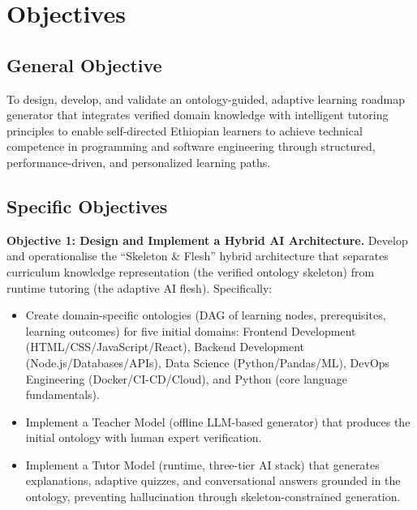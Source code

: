 \section{Objectives}
\label{sec:objectives}

\subsection{General Objective}

To design, develop, and validate an ontology-guided, adaptive learning roadmap generator that integrates verified domain knowledge with intelligent tutoring principles to enable self-directed Ethiopian learners to achieve technical competence in programming and software engineering through structured, performance-driven, and personalized learning paths.

\subsection{Specific Objectives}

\textbf{Objective 1: Design and Implement a Hybrid AI Architecture.} Develop and operationalise the \enquote{Skeleton \& Flesh} hybrid architecture that separates curriculum knowledge representation (the verified ontology skeleton) from runtime tutoring (the adaptive AI flesh). Specifically:
\begin{itemize}
    \item Create domain-specific ontologies (DAG of learning nodes, prerequisites, learning outcomes) for five initial domains: Frontend Development (HTML/CSS/JavaScript/React), Backend Development (Node.js/Databases/APIs), Data Science (Python/Pandas/ML), DevOps Engineering (Docker/CI-CD/Cloud), and Python (core language fundamentals).
    \item Implement a Teacher Model (offline LLM-based generator) that produces the initial ontology with human expert verification.
    \item Implement a Tutor Model (runtime, three-tier AI stack) that generates explanations, adaptive quizzes, and conversational answers grounded in the ontology, preventing hallucination through skeleton-constrained generation.
\end{itemize}

